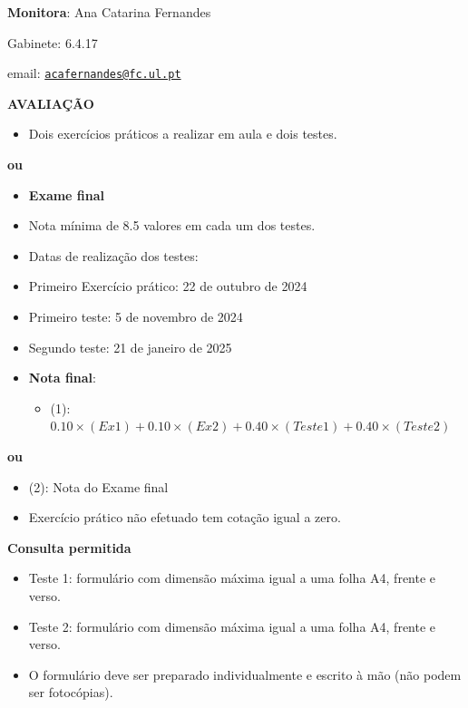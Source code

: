 \documentclass[
]{book}
\providecommand{\tightlist}{%
  \setlength{\itemsep}{0pt}\setlength{\parskip}{0pt}}
\begin{document}
\textbf{Monitora}: Ana Catarina Fernandes

Gabinete: 6.4.17

email: \href{mailto:acafernandes@fc.ul.pt}{\nolinkurl{acafernandes@fc.ul.pt}}

\textbf{AVALIAÇÃO}

\begin{itemize}
\tightlist
\item
  Dois exercícios práticos a realizar em aula e dois testes.
\end{itemize}

\textbf{ou}

\begin{itemize}
\item
  \textbf{Exame final}
\item
  Nota mínima de 8.5 valores em cada um dos testes.
\item
  Datas de realização dos testes:
\item
  Primeiro Exercício prático: 22 de outubro de 2024
\item
  Primeiro teste: 5 de novembro de 2024
\item
  Segundo teste: 21 de janeiro de 2025
\item
  \textbf{Nota final}:

  \begin{itemize}
  \tightlist
  \item
    (1):
    \(0.10\times(Ex1) + 0.10\times(Ex2) + 0.40\times(Teste1) + 0.40\times(Teste2)\)
  \end{itemize}
\end{itemize}

\textbf{ou}

\begin{itemize}
\item
  (2): Nota do Exame final
\item
  Exercício prático não efetuado tem cotação igual a zero.
\end{itemize}

\textbf{Consulta permitida}

\begin{itemize}
\item
  Teste 1: formulário com dimensão máxima igual a uma folha A4, frente
  e verso.
\item
  Teste 2: formulário com dimensão máxima igual a uma folha A4, frente
  e verso.
\item
  O formulário deve ser preparado individualmente e escrito à mão (não
  podem ser fotocópias).
\end{itemize}
\end{document}
